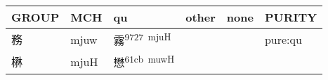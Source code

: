 \documentclass[14pt,a4paper]{scrartcl}
\begin{document}
\begin{longtable}[c]{@{}llllll@{}}
\toprule
\begin{minipage}[b]{0.14\columnwidth}\raggedright\strut
GROUP
\strut\end{minipage} &
\begin{minipage}[b]{0.14\columnwidth}\raggedright\strut
MCH
\strut\end{minipage} &
\begin{minipage}[b]{0.14\columnwidth}\raggedright\strut
qu
\strut\end{minipage} &
\begin{minipage}[b]{0.14\columnwidth}\raggedright\strut
other
\strut\end{minipage} &
\begin{minipage}[b]{0.14\columnwidth}\raggedright\strut
none
\strut\end{minipage} &
\begin{minipage}[b]{0.14\columnwidth}\raggedright\strut
PURITY
\strut\end{minipage}\tabularnewline
\midrule
\endhead
\begin{minipage}[t]{0.14\columnwidth}\raggedright\strut
務
\strut\end{minipage} &
\begin{minipage}[t]{0.14\columnwidth}\raggedright\strut
mjuw
\strut\end{minipage} &
\begin{minipage}[t]{0.14\columnwidth}\raggedright\strut
霧\textsuperscript{9727~mjuH}
\strut\end{minipage} &
\begin{minipage}[t]{0.14\columnwidth}\raggedright\strut
\strut\end{minipage} &
\begin{minipage}[t]{0.14\columnwidth}\raggedright\strut
\strut\end{minipage} &
\begin{minipage}[t]{0.14\columnwidth}\raggedright\strut
pure:qu
\strut\end{minipage}\tabularnewline
\begin{minipage}[t]{0.14\columnwidth}\raggedright\strut
楙
\strut\end{minipage} &
\begin{minipage}[t]{0.14\columnwidth}\raggedright\strut
mjuH
\strut\end{minipage} &
\begin{minipage}[t]{0.14\columnwidth}\raggedright\strut
懋\textsuperscript{61cb~muwH}
\strut\end{minipage} &

\end{longtable}
\end{document}

